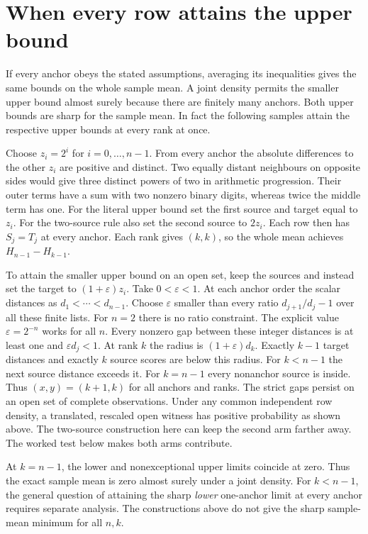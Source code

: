 \clearpage

\section{When every row attains the upper bound}\label{when-every-row-attains-the-upper-bound}

If every anchor obeys the stated assumptions, averaging its inequalities gives the same bounds on the whole sample mean. A joint density permits the smaller upper bound almost surely because there are finitely many anchors. Both upper bounds are sharp for the sample mean. In fact the following samples attain the respective upper bounds at every rank at once.

Choose \(z_i=2^i\) for \(i=0,\ldots,n-1\). From every anchor the absolute differences to the other \(z_i\) are positive and distinct. Two equally distant neighbours on opposite sides would give three distinct powers of two in arithmetic progression. Their outer terms have a sum with two nonzero binary digits, whereas twice the middle term has one. For the literal upper bound set the first source and target equal to \(z_i\). For the two-source rule also set the second source to \(2z_i\). Each row then has \(S_j=T_j\) at every anchor. Each rank gives \((k,k)\), so the whole mean achieves \(H_{n-1}-H_{k-1}\).

To attain the smaller upper bound on an open set, keep the sources and instead set the target to \((1+\varepsilon)z_i\). Take \(0<\varepsilon<1\). At each anchor order the scalar distances as \(d_1<\cdots<d_{n-1}\). Choose \(\varepsilon\) smaller than every ratio \(d_{j+1}/d_j-1\) over all these finite lists. For \(n=2\) there is no ratio constraint. The explicit value \(\varepsilon=2^{-n}\) works for all \(n\). Every nonzero gap between these integer distances is at least one and \(\varepsilon d_j<1\). At rank \(k\) the radius is \((1+\varepsilon)d_k\). Exactly \(k-1\) target distances and exactly \(k\) source scores are below this radius. For \(k<n-1\) the next source distance exceeds it. For \(k=n-1\) every nonanchor source is inside. Thus \((x,y)=(k+1,k)\) for all anchors and ranks. The strict gaps persist on an open set of complete observations. Under any common independent row density, a translated, rescaled open witness has positive probability as shown above. The two-source construction here can keep the second arm farther away. The worked test below makes both arms contribute.

At \(k=n-1\), the lower and nonexceptional upper limits coincide at zero. Thus the exact sample mean is zero almost surely under a joint density. For \(k<n-1\), the general question of attaining the sharp \emph{lower} one-anchor limit at every anchor requires separate analysis. The constructions above do not give the sharp sample-mean minimum for all \(n,k\).

